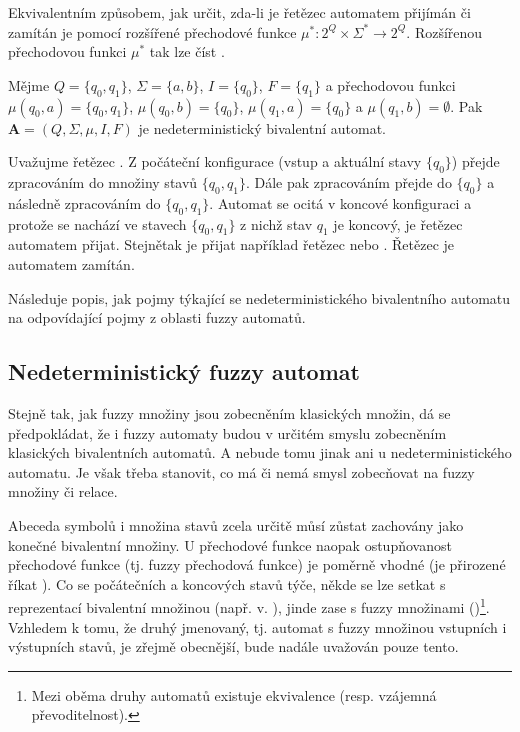 Ekvivalentním způsobem, jak určit, zda-li je řetězec automatem přijímán či zamítán je pomocí rozšířené přechodové funkce $\mu^*: 2^Q \times \Sigma^* \rightarrow 2^Q$. Rozšířenou přechodovou funkci $\mu^*$ tak lze číst .

\begin{example}
 Mějme $Q = \{ q_0, q_1 \}$, $\Sigma = \{ a, b \}$, $I = \{ q_0 \}$, $F = \{ q_1 \}$ a přechodovou funkci $\mu(q_0, a) = \{ q_0, q_1 \}$, $\mu(q_0, b) = \{ q_0 \}$, $\mu(q_1, a) = \{ q_0 \}$ a $\mu(q_1, b) = \emptyset $. Pak $\mathbf{A} = (Q, \Sigma, \mu, I, F)$ je nedeterministický bivalentní automat.
 
 Uvažujme řetězec . Z počáteční konfigurace (vstup  a aktuální stavy $\{ q_0 \}$) přejde zpracováním  do množiny stavů $\{ q_0, q_1 \}$. Dále pak zpracováním  přejde do $\{ q_0 \}$ a následně zpracováním  do $\{ q_0, q_1 \}$. Automat se ocitá v koncové konfiguraci a protože se nachází ve stavech $\{ q_0, q_1 \}$ z nichž stav $q_1$ je koncový, je řetězec  automatem přijat. Stejnětak je přijat například řetězec  nebo . Řetězec  je automatem zamítán.
\end{example}

Následuje popis, jak pojmy týkající se nedeterministického bivalentního automatu  na odpovídající pojmy z oblasti fuzzy automatů. 

\subsection{Nedeterministický fuzzy automat}
Stejně tak, jak fuzzy množiny jsou zobecněním klasických  množin, dá se předpokládat, že i fuzzy automaty budou v určitém smyslu zobecněním klasických bivalentních automatů. A nebude tomu jinak ani u nedeterministického automatu. Je však třeba stanovit, co má či nemá smysl zobecňovat na fuzzy množiny či relace.

Abeceda symbolů i množina stavů zcela určitě můsí zůstat zachovány jako konečné bivalentní množiny. U přechodové funkce naopak ostupňovanost přechodové funkce (tj. fuzzy přechodová funkce) je poměrně vhodné (je přirozené říkat ). Co se počátečních a koncových stavů týče, někde se lze setkat s reprezentací bivalentní množinou (např. v. \cite{AndAbdAsm-ApprPattMatcFuzzLog, SnaKepAbrHas-AproxStriMatchFuzzAut}), jinde zase s fuzzy množinami (\cite{StaCir-ConsFuzzAutFuzzRegExp, AstGariGonVillFar-ApprStrMatUsiDefFuzzAutLearExpr, Bel-DetFuzAut, GonGar-FuzzLangInfRanAccGuzzAutPumLemDetProc})\footnote{Mezi oběma druhy automatů existuje ekvivalence (resp. vzájemná převoditelnost).}. Vzhledem k tomu, že druhý jmenovaný, tj. automat s fuzzy množinou vstupních i 
výstupních stavů, je zřejmě obecnější, bude nadále uvažován pouze tento.

